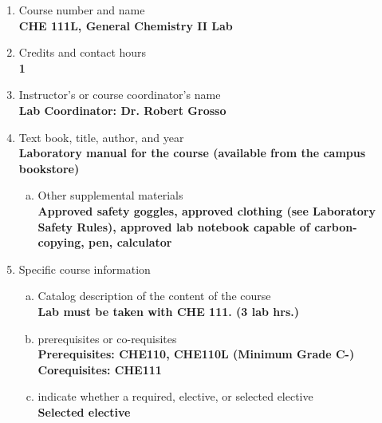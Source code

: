 \label{CHE111L}  %
\begin{enumerate}[1.]
\item Course number and name\\
  {\bfseries
CHE 111L, General Chemistry II Lab
  }

\item Credits and contact hours\\
  {\bfseries
1
  }

\item Instructor's or course coordinator's name\\
  {\bfseries
    Lab Coordinator: Dr. Robert Grosso
  }

\item Text book, title, author, and year\\
  {\bfseries
    Laboratory manual for the course (available from the campus bookstore)
  }
\begin{enumerate}[a.]
\item Other supplemental materials\\
  {\bfseries
  Approved safety goggles, approved clothing (see Laboratory Safety Rules), approved lab notebook capable of carbon-copying, pen, calculator
  }
\end{enumerate}

\item Specific course information
\begin{enumerate}[a.]
\item Catalog description of the content of the course\\
  {\bfseries
Lab must be taken with CHE 111. (3 lab hrs.)
  }

\item prerequisites or co-requisites\\
  {\bfseries
    Prerequisites: CHE110, CHE110L (Minimum Grade C-)\\
    Corequisites: CHE111
  }

\item indicate whether a required, elective, or selected elective\\ %
  {\bfseries
    Selected elective
  }


\end{enumerate}
\end{enumerate}
